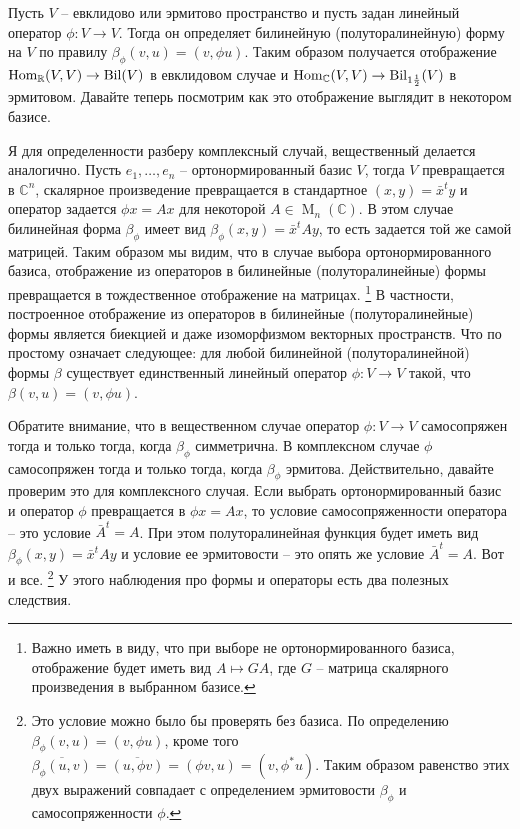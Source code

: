 Пусть $V$ -- евклидово или эрмитово пространство и пусть задан линейный оператор $\phi\colon V\to V$.
Тогда он определяет билинейную (полуторалинейную) форму на $V$ по правилу $\beta_\phi(v, u) = (v, \phi u)$.
Таким образом получается отображение $\operatorname{Hom}_\mathbb R(V, V)\to \operatorname{Bil}(V)$ в евклидовом случае и $\operatorname{Hom}_\mathbb C(V, V)\to \operatorname{Bil}_{1\frac{1}{2}}(V)$ в эрмитовом.
Давайте теперь посмотрим как это отображение выглядит в некотором базисе.

Я для определенности разберу комплексный случай, вещественный делается аналогично.
Пусть $e_1,\ldots,e_n$ -- ортонормированный базис $V$, тогда $V$ превращается в $\mathbb C^n$, скалярное произведение превращается в стандартное $(x, y) = \bar x^t y$ и оператор задается $\phi x = Ax$ для некоторой $A\in \operatorname{M}_n(\mathbb C)$.
В этом случае билинейная форма $\beta_\phi$ имеет вид $\beta_\phi(x,y) = \bar x^t A y$, то есть задается той же самой матрицей.
Таким образом мы видим, что в случае выбора ортонормированного базиса, отображение из операторов в билинейные (полуторалинейные) формы превращается в тождественное отображение на матрицах.%
\footnote{Важно иметь в виду, что при выборе не ортонормированного базиса, отображение будет иметь вид $A\mapsto G A$, где $G$ -- матрица скалярного произведения в выбранном базисе.}
В частности, построенное отображение из операторов в билинейные (полуторалинейные) формы является биекцией и даже изоморфизмом векторных пространств.
Что по простому означает следующее: для любой билинейной (полуторалинейной) формы $\beta$ существует единственный линейный оператор $\phi\colon V\to V$ такой, что $\beta(v,u) = (v, \phi u)$.

Обратите внимание, что в вещественном случае оператор $\phi\colon V\to V$ самосопряжен тогда и только тогда, когда $\beta_\phi$ симметрична.
В комплексном случае $\phi$ самосопряжен тогда и только тогда, когда $\beta_\phi$ эрмитова.
Действительно, давайте проверим это для комплексного случая.
Если выбрать ортонормированный базис и оператор $\phi$ превращается в $\phi x = A x$, то условие самосопряженности оператора -- это условие $\bar A^t = A$.
При этом полуторалинейная функция будет иметь вид $\beta_\phi(x, y) = \bar x^t A y$ и условие ее эрмитовости -- это опять же условие $\bar A^t = A$.
Вот и все.%
\footnote{Это условие можно было бы проверять без базиса.
По определению $\beta_\phi(v, u) = (v, \phi u)$, кроме того $\overline{\beta_\phi(u, v)} = \overline{(u, \phi v)} = (\phi v, u) = (v, \phi^* u)$.
Таким образом равенство этих двух выражений совпадает с определением эрмитовости $\beta_\phi$ и самосопряженности $\phi$.}
У этого наблюдения про формы и операторы есть два полезных следствия.


